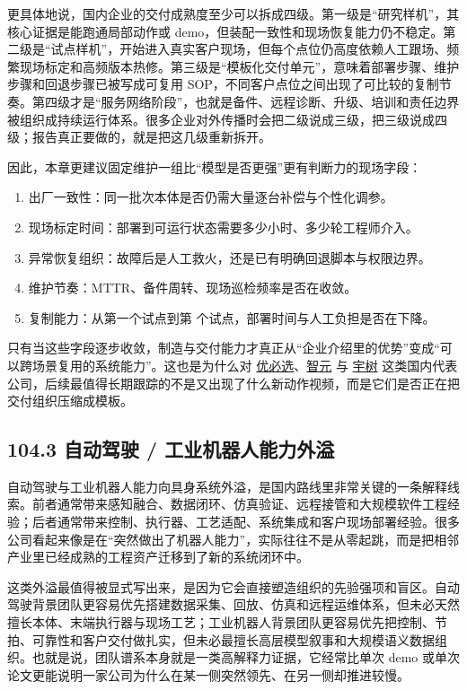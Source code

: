 更具体地说，国内企业的交付成熟度至少可以拆成四级。第一级是“研究样机”，其核心证据是能跑通局部动作或 demo，但装配一致性和现场恢复能力仍不稳定。第二级是“试点样机”，开始进入真实客户现场，但每个点位仍高度依赖人工跟场、频繁现场标定和高频版本热修。第三级是“模板化交付单元”，意味着部署步骤、维护步骤和回退步骤已被写成可复用 SOP，不同客户点位之间出现了可比较的复制节奏。第四级才是“服务网络阶段”，也就是备件、远程诊断、升级、培训和责任边界被组织成持续运行体系。很多企业对外传播时会把二级说成三级，把三级说成四级；报告真正要做的，就是把这几级重新拆开。

因此，本章更建议固定维护一组比“模型是否更强”更有判断力的现场字段：

\begin{enumerate}
\item 出厂一致性：同一批次本体是否仍需大量逐台补偿与个性化调参。
\item 现场标定时间：部署到可运行状态需要多少小时、多少轮工程师介入。
\item 异常恢复组织：故障后是人工救火，还是已有明确回退脚本与权限边界。
\item 维护节奏：MTTR、备件周转、现场巡检频率是否在收敛。
\item 复制能力：从第一个试点到第 \texttt{} 个试点，部署时间与人工负担是否在下降。
\end{enumerate}

只有当这些字段逐步收敛，制造与交付能力才真正从“企业介绍里的优势”变成“可以跨场景复用的系统能力”。这也是为什么对 \href{https://www.ubtrobot.com/}{优必选}、\href{https://www.agibot.com/}{智元} 与 \href{https://www.unitree.com/}{宇树} 这类国内代表公司，后续最值得长期跟踪的不是又出现了什么新动作视频，而是它们是否正在把交付组织压缩成模板。

\subsection*{104.3 自动驾驶 / 工业机器人能力外溢}


自动驾驶与工业机器人能力向具身系统外溢，是国内路线里非常关键的一条解释线索。前者通常带来感知融合、数据闭环、仿真验证、远程接管和大规模软件工程经验；后者通常带来控制、执行器、工艺适配、系统集成和客户现场部署经验。很多公司看起来像是在“突然做出了机器人能力”，实际往往不是从零起跳，而是把相邻产业里已经成熟的工程资产迁移到了新的系统闭环中。

这类外溢最值得被显式写出来，是因为它会直接塑造组织的先验强项和盲区。自动驾驶背景团队更容易优先搭建数据采集、回放、仿真和远程运维体系，但未必天然擅长本体、末端执行器与现场工艺；工业机器人背景团队更容易优先把控制、节拍、可靠性和客户交付做扎实，但未必最擅长高层模型叙事和大规模语义数据组织。也就是说，团队谱系本身就是一类高解释力证据，它经常比单次 demo 或单次论文更能说明一家公司为什么在某一侧突然领先、在另一侧却推进较慢。


